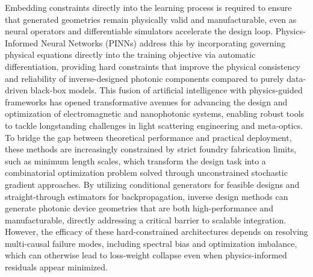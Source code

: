 Embedding constraints directly into the learning process is required to ensure that generated geometries remain physically valid and manufacturable, even as neural operators and differentiable simulators accelerate the design loop. Physics-Informed Neural Networks (PINNs) address this by incorporating governing physical equations directly into the training objective via automatic differentiation, providing hard constraints that improve the physical consistency and reliability of inverse-designed photonic components compared to purely data-driven black-box models. \citep{doi_10_48550_arxiv_2606_12337_68b62bfa} \citep{doi_10_48550_arxiv_2603_09359_098af542} This fusion of artificial intelligence with physics-guided frameworks has opened transformative avenues for advancing the design and optimization of electromagnetic and nanophotonic systems, enabling robust tools to tackle longstanding challenges in light scattering engineering and meta-optics. To bridge the gap between theoretical performance and practical deployment, these methods are increasingly constrained by strict foundry fabrication limits, such as minimum length scales, which transform the design task into a combinatorial optimization problem solved through unconstrained stochastic gradient approaches. By utilizing conditional generators for feasible designs and straight-through estimators for backpropagation, inverse design methods can generate photonic device geometries that are both high-performance and manufacturable, directly addressing a critical barrier to scalable integration. However, the efficacy of these hard-constrained architectures depends on resolving multi-causal failure modes, including spectral bias and optimization imbalance, which can otherwise lead to loss-weight collapse even when physics-informed residuals appear minimized. \citep{s2_cc39d5405a933620426d86298fa8fe4cd51915c5_27626ee3} \citep{s2_037e66f37189104d61c0d000de0cee202b7eec9e_d15b8018} \citep{doi_10_1021_acsphotonics_2c00313_0d7d39c3}

